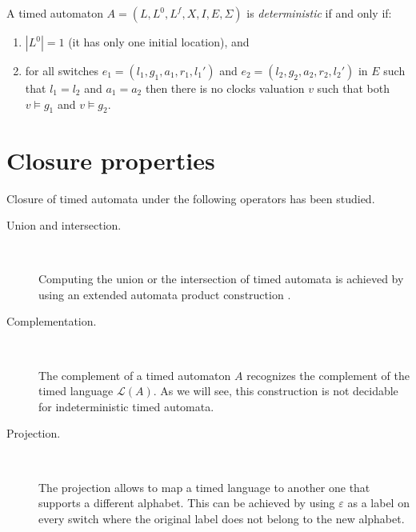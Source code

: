 \begin{definition} \cite{RADLD94,RA98}

A timed automaton $A = (L, L^0, L^f, X, I, E, \Sigma)$ is \emph{deterministic} if and only if:
\begin{enumerate}

	\item $|L^0|=1$ (it has only one initial location), and

	\item for all switches $e_1 = (l_1, g_1, a_1, r_1, l_1')$ and $e_2 = (l_2, g_2, a_2, r_2, l_2')$ in $E$ such that $l_1 = l_2$ and $a_1 = a_2$ then there is no clocks valuation $v$ such that both $v \models g_1$ and $v \models g_2$.

\end{enumerate}
\end{definition}


\section{Closure properties}


Closure of timed automata under the following operators has been studied.
\begin{description}

	\item[Union and intersection.]\

	Computing the union or the intersection of timed automata is achieved by using an extended automata product construction \cite{Hopcroft79,RADLD94}.

	\item[Complementation.]\

	The complement of a timed automaton $A$ recognizes the complement of the timed language $\mathcal{L}(A)$. As we will see, this construction is not decidable for indeterministic timed automata.

	\item[Projection.]\

	The projection allows to map a timed language to another one that supports a different alphabet. This can be achieved by using $\varepsilon$ as a label on every switch where the original label does not belong to the new alphabet.

\end{description}

